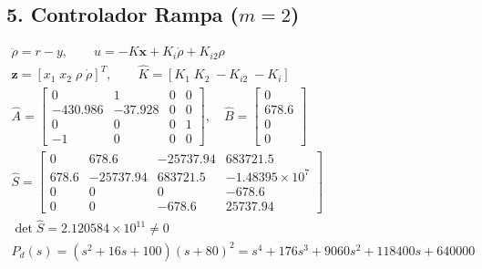 \documentclass[11pt]{article}
\begin{document}
\subsection*{5. Controlador Rampa ($m=2$)}
\begin{gather*}
\ddot\rho=r-y,\qquad u=-K\mathbf x+K_i\dot\rho+K_{i2}\rho\\
\mathbf z=[x_1\;x_2\;\rho\;\dot\rho]^T,\qquad\hat K=[K_1\;K_2\;-K_{i2}\;-K_i]\\
\hat A=\begin{bmatrix}0 & 1 & 0 & 0 \\ -430.986 & -37.928 & 0 & 0 \\ 0 & 0 & 0 & 1 \\ -1 & 0 & 0 & 0\end{bmatrix},\quad\hat B=\begin{bmatrix}0 \\ 678.6 \\ 0 \\ 0\end{bmatrix}\\
\hat S=\begin{bmatrix}0 & 678.6 & -25737.94 & 683721.5 \\ 678.6 & -25737.94 & 683721.5 & -1.48395\times10^{7} \\ 0 & 0 & 0 & -678.6 \\ 0 & 0 & -678.6 & 25737.94\end{bmatrix}\\
\det\hat S=2.120584\times10^{11}\ne0\\
P_d(s)=(s^{2} + 16s + 100)(s+80)^{2}=s^{4} + 176s^{3} + 9060s^{2} + 118400s + 640000
\end{gather*}
\end{document}
